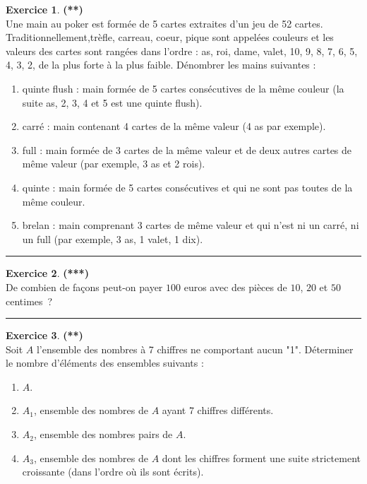 \documentclass[a4paper,11pt]{article}
\theoremstyle{definition}
\newtheorem{exo}{Exercice} %
\begin{document}
\begin{minipage}{1\linewidth}\begin{minipage}[t]{0.48\linewidth}\raggedright

\begin{exo}\textbf{(**)}\quad\\[0.2cm]
Une main au poker est formée de 5 cartes extraites d'un jeu de 52 cartes. Traditionnellement,trèfle, carreau, coeur, pique sont appelées couleurs et les valeurs des cartes sont rangées dans l'ordre : as, roi, dame, valet, 10, 9, 8, 7, 6, 5, 4, 3, 2, de la plus forte à la plus faible. Dénombrer les mains suivantes :
\begin{enumerate}
	\item quinte flush : main formée de 5 cartes consécutives de la même couleur (la suite as, 2, 3, 4 et 5 est une quinte flush).
	\item carré : main contenant 4 cartes de la même valeur (4 as par exemple).
	\item full : main formée de 3 cartes de la même valeur et de deux autres cartes de même valeur (par exemple, 3 as et 2 rois).
	\item quinte : main formée de 5 cartes consécutives et qui ne sont pas toutes de la même couleur.
	\item brelan : main comprenant 3 cartes de même valeur et qui n'est ni un carré, ni un full (par exemple, 3 as, 1 valet, 1 dix).
\end{enumerate}

\centering\rule{1\linewidth}{0.6pt}\end{exo}



\begin{exo}\textbf{(***)}\quad\\[0.2cm]
De combien de façons peut-on payer $100$ euros avec des pièces de $10$, $20$ et $50$ centimes~?

\centering\rule{1\linewidth}{0.6pt}\end{exo}




\end{minipage}\hfill\vrule\hfill\begin{minipage}[t]{0.48\linewidth}\raggedright

\begin{exo}\textbf{(**)}\quad\\[0.2cm]
Soit $A$ l'ensemble des nombres à 7 chiffres ne comportant aucun "1". Déterminer le nombre d'éléments des ensembles suivants :
\begin{enumerate}
	\item $A$.
	\item $A_1$, ensemble des nombres de $A$ ayant 7 chiffres différents.
	\item $A_2$, ensemble des nombres pairs de $A$.
	\item $A_3$, ensemble des nombres de $A$ dont les chiffres forment une suite strictement croissante (dans l'ordre où ils sont écrits).
\end{enumerate}


\end{exo}
\end{minipage}
\end{minipage}
\end{document}
